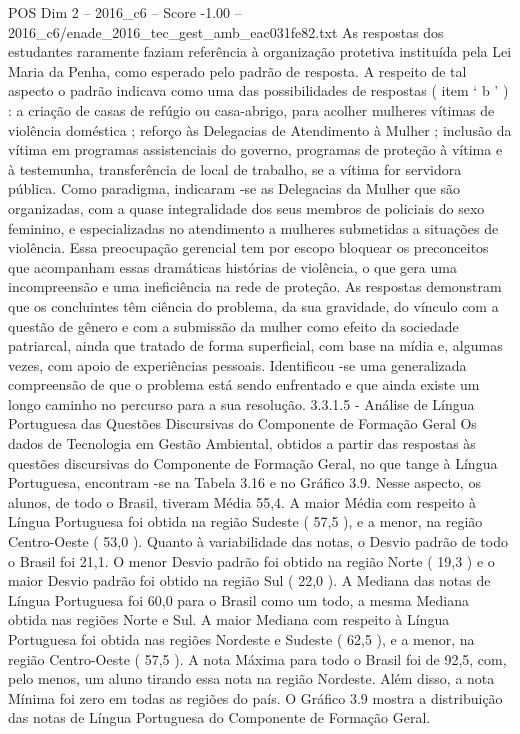 \begin{textsample}{POS Dim 2 – 2016\_c6 – Score -1.00 – 2016\_c6/enade\_2016\_tec\_gest\_amb\_eac031fe82.txt}
As respostas dos estudantes raramente faziam referência à organização protetiva instituída pela Lei Maria da Penha, como esperado pelo padrão de resposta.
A respeito de tal aspecto o padrão indicava como uma das possibilidades de respostas ( item ‘ b ’ ) : a criação de casas de refúgio ou casa-abrigo, para acolher mulheres vítimas de violência doméstica ; reforço às Delegacias de Atendimento à Mulher ; inclusão da vítima em programas assistenciais do governo, programas de proteção à vítima e à testemunha, transferência de local de trabalho, se a vítima for servidora pública.
Como paradigma, indicaram -se as Delegacias da Mulher que são organizadas, com a quase integralidade dos seus membros de policiais do sexo feminino, e especializadas no atendimento a mulheres submetidas a situações de violência.
Essa preocupação gerencial tem por escopo bloquear os preconceitos que acompanham essas dramáticas histórias de violência, o que gera uma incompreensão e uma ineficiência na rede de proteção.
As respostas demonstram que os concluintes têm ciência do problema, da sua gravidade, do vínculo com a questão de gênero e com a submissão da mulher como efeito da sociedade patriarcal, ainda que tratado de forma superficial, com base na mídia e, algumas vezes, com apoio de experiências pessoais.
Identificou -se uma generalizada compreensão de que o problema está sendo enfrentado e que ainda existe um longo caminho no percurso para a sua resolução. 3.3.1.5 - Análise de Língua Portuguesa das Questões Discursivas do Componente de Formação Geral Os dados de Tecnologia em Gestão Ambiental, obtidos a partir das respostas às questões discursivas do Componente de Formação Geral, no que tange à Língua Portuguesa, encontram -se na Tabela 3.16 e no Gráfico 3.9.
Nesse aspecto, os alunos, de todo o Brasil, tiveram Média 55,4.
A maior Média com respeito à Língua Portuguesa foi obtida na região Sudeste ( 57,5 ), e a menor, na região Centro-Oeste ( 53,0 ).
Quanto à variabilidade das notas, o Desvio padrão de todo o Brasil foi 21,1.
O menor Desvio padrão foi obtido na região Norte ( 19,3 ) e o maior Desvio padrão foi obtido na região Sul ( 22,0 ).
A Mediana das notas de Língua Portuguesa foi 60,0 para o Brasil como um todo, a mesma Mediana obtida nas regiões Norte e Sul.
A maior Mediana com respeito à Língua Portuguesa foi obtida nas regiões Nordeste e Sudeste ( 62,5 ), e a menor, na região Centro-Oeste ( 57,5 ).
A nota Máxima para todo o Brasil foi de 92,5, com, pelo menos, um aluno tirando essa nota na região Nordeste.
Além disso, a nota Mínima foi zero em todas as regiões do país.
O Gráfico 3.9 mostra a distribuição das notas de Língua Portuguesa do Componente de Formação Geral.

\end{textsample}
